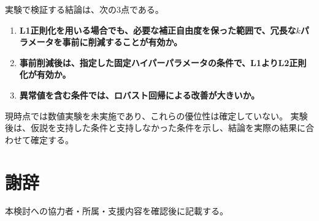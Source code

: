 \documentclass[11pt,a4paper]{ltjsarticle}
\begin{document}
実験で検証する結論は、次の3点である。
\begin{enumerate}
 \item \textbf{L1正則化を用いる場合でも、必要な補正自由度を保った範囲で、冗長な$k$パラメータを事前に削減することが有効か。}
 \item \textbf{事前削減後は、指定した固定ハイパーパラメータの条件で、L1よりL2正則化が有効か。}
 \item \textbf{異常値を含む条件では、ロバスト回帰による改善が大きいか。}
\end{enumerate}
現時点では数値実験を未実施であり、これらの優位性は確定していない。
実験後は、仮説を支持した条件と支持しなかった条件を示し、結論を実際の結果に合わせて確定する。

\section*{謝辞}
本検討への協力者・所属・支援内容を確認後に記載する。
\end{document}
